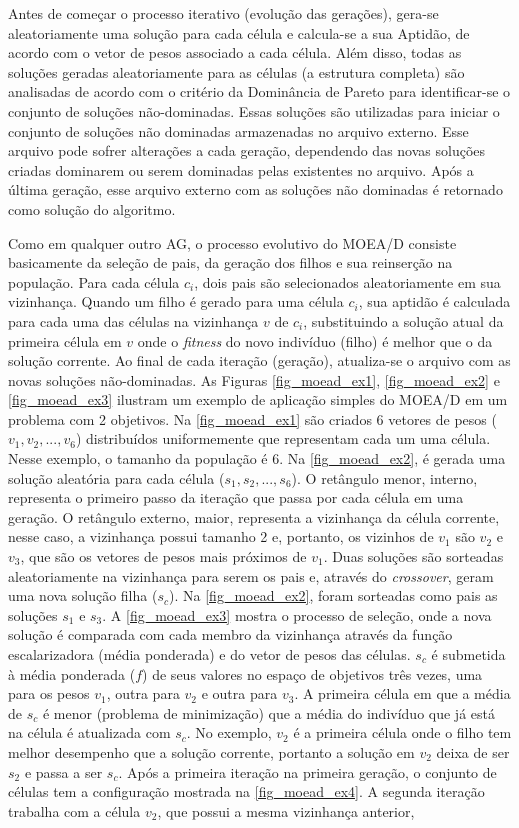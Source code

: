 Antes de começar o processo iterativo (evolução das gerações), gera-se aleatoriamente uma solução para cada célula e calcula-se a sua
Aptidão, de acordo com o vetor de pesos associado a cada célula. Além disso, todas as soluções geradas aleatoriamente para as células (a estrutura completa) são analisadas de acordo com o critério da Dominância de Pareto para identificar-se o conjunto de soluções não-dominadas. Essas soluções são utilizadas para iniciar o conjunto de soluções não dominadas armazenadas no arquivo externo. Esse arquivo pode sofrer alterações a cada geração, dependendo das novas soluções criadas dominarem ou serem dominadas pelas existentes no arquivo. Após a última geração, esse arquivo externo com as soluções não dominadas é retornado como solução do algoritmo.

Como em qualquer outro AG, o processo evolutivo do MOEA/D consiste basicamente da seleção de pais, da geração dos filhos e sua reinserção na população. Para cada célula $c_i$, dois pais são selecionados aleatoriamente em sua vizinhança. Quando um filho é gerado para uma célula $c_i$, sua aptidão é calculada para cada uma das células na vizinhança $v$ de $c_i$, substituindo a solução atual da primeira célula em $v$ onde o \textit{fitness} do novo indivíduo (filho) é melhor que o da solução corrente. Ao final de cada iteração (geração), atualiza-se o arquivo com as novas soluções não-dominadas. As Figuras \ref{fig_moead_ex1}, \ref{fig_moead_ex2} e \ref{fig_moead_ex3} ilustram um exemplo de aplicação simples do MOEA/D em um problema com 2 objetivos. Na \autoref{fig_moead_ex1} são criados 6 vetores de pesos ($v_1, v_2, ..., v_6$) distribuídos uniformemente que representam cada um uma célula. Nesse exemplo, o tamanho da população é 6. Na \autoref{fig_moead_ex2}, é gerada uma solução aleatória para cada célula ($s_1, s_2, ..., s_6$). O retângulo menor, interno, representa o primeiro passo da iteração que passa por cada célula em uma geração. O retângulo externo, maior, representa a vizinhança da célula corrente, nesse caso, a vizinhança possui tamanho 2 e, portanto, os vizinhos de $v_1$ são $v_2$ e $v_3$, que são os vetores de pesos mais próximos de $v_1$. Duas soluções são sorteadas aleatoriamente na vizinhança para serem os pais e, através do \textit{crossover}, geram uma nova solução filha ($s_c$). Na \autoref{fig_moead_ex2}, foram sorteadas como pais as soluções $s_1$ e $s_3$. A \autoref{fig_moead_ex3} mostra o processo de seleção, onde a nova solução é comparada com cada membro da vizinhança através da função escalarizadora (média ponderada) e do vetor de pesos das células. $s_c$ é submetida à média ponderada ($f$) de seus valores no espaço de objetivos três vezes, uma para os pesos $v_1$, outra para $v_2$ e outra para $v_3$. A primeira célula em que a média de $s_c$ é menor (problema de minimização) que a média do indivíduo que já está na célula é atualizada com $s_c$. No exemplo, $v_2$ é a primeira célula onde o filho tem melhor desempenho que a solução corrente, portanto a solução em $v_2$ deixa de ser $s_2$ e passa a ser $s_c$. Após a primeira iteração na primeira geração, o conjunto de células tem a configuração mostrada na  \autoref{fig_moead_ex4}. A segunda iteração trabalha com a célula $v_2$, que possui a mesma vizinhança anterior, 